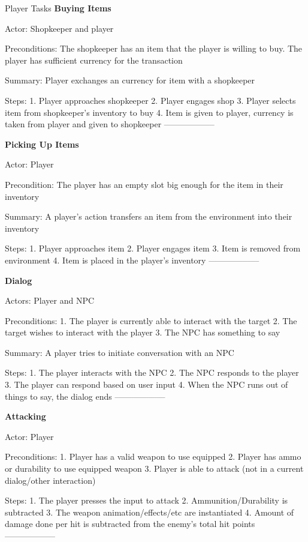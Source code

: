 \documentclass[12pt]{report}
\begin{document}
\begin {section}{Player Tasks}
\textbf{Buying Items} %

Actor: Shopkeeper and player

Preconditions: The shopkeeper has an item that the player is willing to buy. The player has sufficient
currency for the transaction

Summary: Player exchanges an currency for item with a shopkeeper

Steps: 
1. Player approaches shopkeeper
2. Player engages shop
3. Player selects item from shopkeeper's inventory to buy
4. Item is given to player, currency is taken from player and given to shopkeeper
------------------

\textbf{Picking Up Items} %

Actor: Player

Precondition: The player has an empty slot big enough for the item in their inventory

Summary: A player's action transfers an item from the environment into their inventory

Steps:
1. Player approaches item
2. Player engages item
3. Item is removed from environment
4. Item is placed in the player's  inventory
------------------

\textbf{Dialog} %

Actors: Player and NPC

Preconditions:
1. The player is currently able to interact with the target
2. The target wishes to interact with the player
3. The NPC has something to say

Summary: A player tries to initiate conversation with an NPC

Steps:
1. The player interacts with the NPC
2. The NPC responds to the player
3. The player can respond based on user input
4. When the NPC runs out of things to say, the dialog ends
------------------

\textbf{Attacking} %

Actor: Player

Preconditions:
1. Player has a valid weapon to use equipped
2. Player has ammo or durability to use equipped weapon
3. Player is able to attack (not in a current dialog/other interaction)

Steps:
1. The player presses the input to attack
2. Ammunition/Durability is subtracted
3. The weapon animation/effects/etc are instantiated
4. Amount of damage done per hit is subtracted from the enemy's total hit points
------------------


\end{section}
\end{document}
